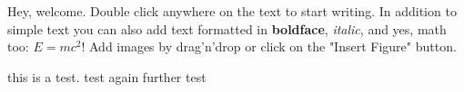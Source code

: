 Hey, welcome. Double click anywhere on the text to start writing. In addition to simple text you can also add text formatted in \textbf{boldface}, \textit{italic}, and yes, math too: $E  =  mc^{2}$! Add images by drag'n'drop or click on the "Insert Figure" button.

this is a test. \cite{Birge_1985}
  test again \cite{Takriti_1996}  further test \cite{Yang}
  
  